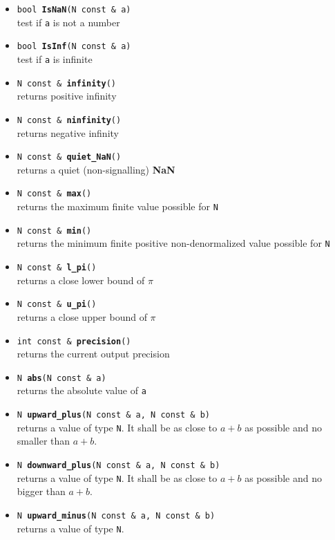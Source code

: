 \documentclass{report}
\begin{document}
	\begin{itemize}
		\item \texttt{bool {\bf IsNaN}(N const \& a)}\\ 
			test if \texttt{a} is not a number
		\item \texttt{bool {\bf IsInf}(N const \& a)}\\
			test if \texttt{a} is infinite
		\item \texttt{N const \& {\bf infinity}()}\\ returns positive infinity
		\item \texttt{N const \& {\bf ninfinity}()}\\ returns negative infinity
		\item \texttt{N const \& {\bf quiet\_NaN}()}\\ returns a quiet
			(non-signalling) {\bf NaN}
		\item \texttt{N const \& {\bf max}()}\\ returns the maximum finite value
			possible for \texttt{N}
		\item \texttt{N const \& {\bf min}()}\\ returns the minimum finite
			positive non-denormalized value possible for \texttt{N}
		\item \texttt{N const \& {\bf l\_pi}()}\\ returns a close lower bound of $\pi$
		\item \texttt{N const \& {\bf u\_pi}()}\\ returns a close upper bound of $\pi$
		\item \texttt{int const \& {\bf precision}()}\\ returns the current
			output precision
		\item \texttt{N {\bf abs}(N const \& a)}\\ returns the absolute
			value of \texttt{a}
		\item \texttt{N {\bf upward\_plus}(N const \& a, N const \& b)}\\
			returns a value of type \texttt{N}.
			It shall be as close to $a+b$ as possible and
			no smaller than $a+b$.
		\item \texttt{N {\bf downward\_plus}(N const \& a, N const \& b)}\\
			returns a value of type \texttt{N}.
			It shall be as close to $a+b$ as possible and
			no bigger than $a+b$.
		\item \texttt{N {\bf upward\_minus}(N const \& a, N const \& b)}\\
			returns a value of type \texttt{N}.

\end{itemize}
\end{document}

